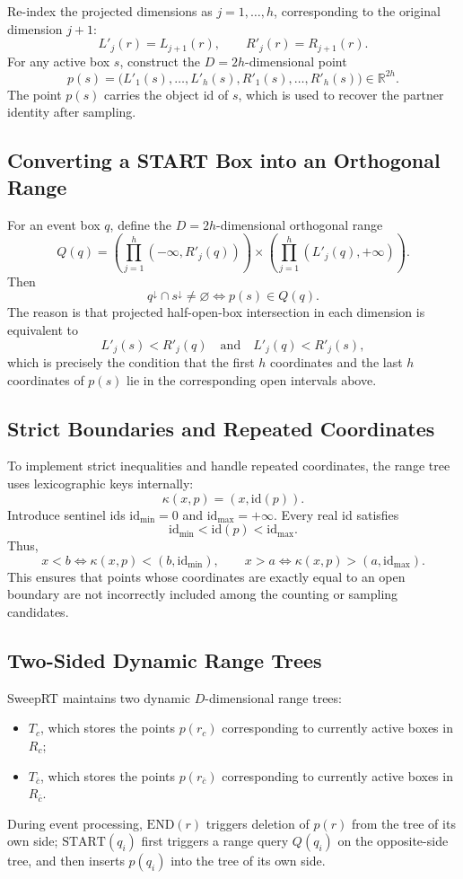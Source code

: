 \documentclass[11pt]{article}
\newcommand{\Rc}{R_c}
\newcommand{\Rbar}{R_{\bar c}}
\newcommand{\Start}{\mathrm{START}}
\newcommand{\End}{\mathrm{END}}
\newcommand{\id}{\mathrm{id}}
\newcommand{\idmin}{\id_{\min}}
\newcommand{\idmax}{\id_{\max}}
\newcommand{\proj}[1]{{#1}^{\downarrow}}
\begin{document}
Re-index the projected dimensions as \(j=1,\ldots,h\), corresponding to the original dimension \(j+1\):
\[
 L'_j(r)=L_{j+1}(r),
 \qquad
 R'_j(r)=R_{j+1}(r).
\]
For any active box \(s\), construct the \(D=2h\)-dimensional point
\[
 p(s)=\bigl(L'_1(s),\ldots,L'_h(s),R'_1(s),\ldots,R'_h(s)\bigr)\in\mathbb R^{2h}.
\]
The point \(p(s)\) carries the object id of \(s\), which is used to recover the partner identity after sampling.

\subsection{Converting a START Box into an Orthogonal Range}

For an event box \(q\), define the \(D=2h\)-dimensional orthogonal range
\[
Q(q)=
\left(\prod_{j=1}^{h}(-\infty,R'_j(q))\right)
\times
\left(\prod_{j=1}^{h}(L'_j(q),+\infty)\right).
\]
Then
\[
 \proj q\cap\proj s\neq\varnothing
 \iff
 p(s)\in Q(q).
\]
The reason is that projected half-open-box intersection in each dimension is equivalent to
\[
 L'_j(s)<R'_j(q)
 \quad\text{and}\quad
 L'_j(q)<R'_j(s),
\]
which is precisely the condition that the first \(h\) coordinates and the last \(h\) coordinates of \(p(s)\) lie in the corresponding open intervals above.

\subsection{Strict Boundaries and Repeated Coordinates}

To implement strict inequalities and handle repeated coordinates, the range tree uses lexicographic keys internally:
\[
 \kappa(x,p)=(x,\id(p)).
\]
Introduce sentinel ids \(\idmin=0\) and \(\idmax=+\infty\). Every real id satisfies
\[
 \idmin<\id(p)<\idmax.
\]
Thus,
\[
 x<b \iff \kappa(x,p)<(b,\idmin),
 \qquad
 x>a \iff \kappa(x,p)>(a,\idmax).
\]
This ensures that points whose coordinates are exactly equal to an open boundary are not incorrectly included among the counting or sampling candidates.

\subsection{Two-Sided Dynamic Range Trees}

SweepRT maintains two dynamic \(D\)-dimensional range trees:
\begin{itemize}[leftmargin=2em]
  \item \(T_c\), which stores the points \(p(r_c)\) corresponding to currently active boxes in \(\Rc\);
  \item \(T_{\bar c}\), which stores the points \(p(r_{\bar c})\) corresponding to currently active boxes in \(\Rbar\).
\end{itemize}
During event processing, \(\End(r)\) triggers deletion of \(p(r)\) from the tree of its own side; \(\Start(q_i)\) first triggers a range query \(Q(q_i)\) on the opposite-side tree, and then inserts \(p(q_i)\) into the tree of its own side.
\end{document}

